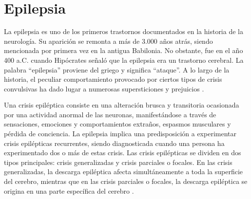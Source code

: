 \section{Epilepsia}
La epilepsia es uno de los primeros trastornos documentados en la historia de la neurología. Su aparición se remonta a más de 3.000 años atrás, siendo mencionada por primera vez en la antigua Babilonia. No obstante, fue en el año 400 a.C. cuando Hipócrates señaló que la epilepsia era un trastorno cerebral. La palabra ``epilepsia'' proviene del griego y significa ``ataque''. A lo largo de la historia, el peculiar comportamiento provocado por ciertos tipos de crisis convulsivas ha dado lugar a numerosas supersticiones y prejuicios \cite{wyllie2006treatment}.

Una crisis epiléptica consiste en una alteración brusca y transitoria ocasionada por una actividad anormal de las neuronas, manifestándose a través de sensaciones, emociones y comportamientos extraños, espasmos musculares y pérdida de conciencia. La epilepsia implica una predisposición a experimentar crisis epilépticas recurrentes, siendo diagnosticada cuando una persona ha experimentado dos o más de estas crisis. Las crisis epilépticas se dividen en dos tipos principales: crisis generalizadas y crisis parciales o focales. En las crisis generalizadas, la descarga epiléptica afecta simultáneamente a toda la superficie del cerebro, mientras que en las crisis parciales o focales, la descarga epiléptica se origina en una parte específica del cerebro \cite{garcia2011feen}.


